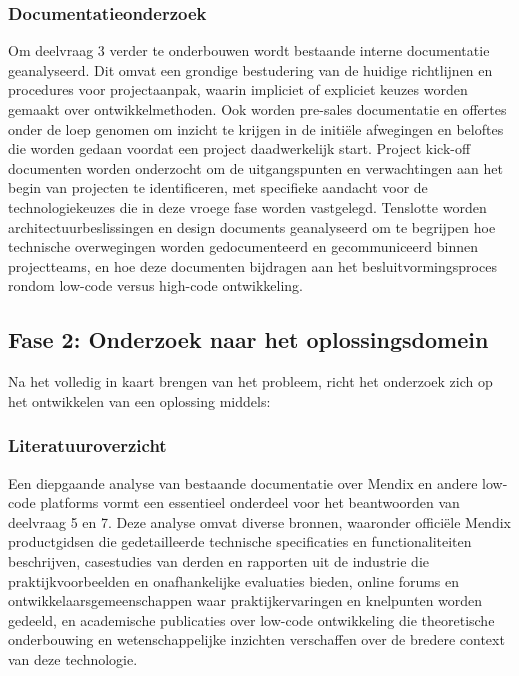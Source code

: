 \subsubsection{Documentatieonderzoek}
Om deelvraag 3 verder te onderbouwen wordt bestaande interne documentatie geanalyseerd. Dit omvat een grondige bestudering van de huidige richtlijnen en procedures voor projectaanpak, waarin impliciet of expliciet keuzes worden gemaakt over ontwikkelmethoden. Ook worden pre-sales documentatie en offertes onder de loep genomen om inzicht te krijgen in de initiële afwegingen en beloftes die worden gedaan voordat een project daadwerkelijk start. Project kick-off documenten worden onderzocht om de uitgangspunten en verwachtingen aan het begin van projecten te identificeren, met specifieke aandacht voor de technologiekeuzes die in deze vroege fase worden vastgelegd. Tenslotte worden architectuurbeslissingen en design documents geanalyseerd om te begrijpen hoe technische overwegingen worden gedocumenteerd en gecommuniceerd binnen projectteams, en hoe deze documenten bijdragen aan het besluitvormingsproces rondom low-code versus high-code ontwikkeling.

\subsection{Fase 2: Onderzoek naar het oplossingsdomein}
Na het volledig in kaart brengen van het probleem, richt het onderzoek zich op het ontwikkelen van een oplossing middels:
\subsubsection{Literatuuroverzicht}
Een diepgaande analyse van bestaande documentatie over Mendix en andere low-code platforms vormt een essentieel onderdeel voor het beantwoorden van deelvraag 5 en 7. Deze analyse omvat diverse bronnen, waaronder officiële Mendix productgidsen die gedetailleerde technische specificaties en functionaliteiten beschrijven, casestudies van derden en rapporten uit de industrie die praktijkvoorbeelden en onafhankelijke evaluaties bieden, online forums en ontwikkelaarsgemeenschappen waar praktijkervaringen en knelpunten worden gedeeld, en academische publicaties over low-code ontwikkeling die theoretische onderbouwing en wetenschappelijke inzichten verschaffen over de bredere context van deze technologie.
